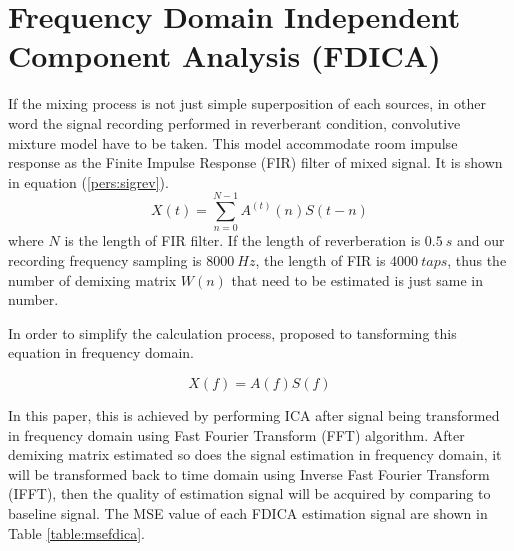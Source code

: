 \documentclass[a4paper]{jpconf}
\begin{document}
\section{Frequency Domain Independent Component Analysis (FDICA)}
If the mixing process is not just simple superposition of each sources, in other word the signal recording performed in reverberant condition, convolutive mixture model have to be taken. This model accommodate room impulse response as the Finite Impulse Response (FIR) filter of mixed signal. It is shown in equation (\ref{pers:sigrev}).
\begin{equation}\label{pers:sigrev}
X(t) = \sum_{n=0}^{N-1}A^{(t)}(n)S(t-n)
\end{equation}
where $N$ is the length of FIR filter. If the length of reverberation is $0.5~s$ and our recording frequency sampling is $8000~Hz$, the length of FIR is $4000~taps$, thus the number of demixing matrix $W(n)$ that need to be estimated is just same in number.

In order to simplify the calculation process, \cite{6} proposed to tansforming this equation in frequency domain.

\begin{equation}
X(f)=A(f)S(f)
\end{equation}

In this paper, this is achieved by performing ICA after signal being transformed in frequency domain using Fast Fourier Transform (FFT) algorithm. After demixing matrix estimated so does the signal estimation in frequency domain, it will be transformed back to time domain using Inverse Fast Fourier Transform (IFFT), then the quality of estimation signal will be acquired by comparing to baseline signal. The MSE value of each FDICA estimation signal are shown in Table \ref{table:msefdica}.
\end{document}
